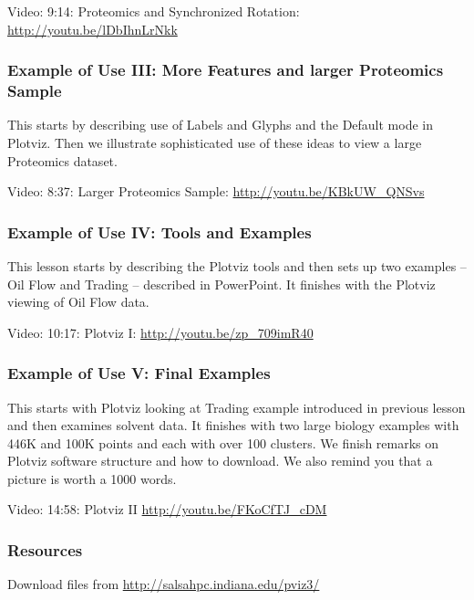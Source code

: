 Video: 9:14: Proteomics and Synchronized Rotation:
\url{http://youtu.be/lDbIhnLrNkk}

\subsubsection{Example of Use III: More Features and larger Proteomics
Sample}\label{example-of-use-iii-more-features-and-larger-proteomics-sample}

This starts by describing use of Labels and Glyphs and the Default mode
in Plotviz. Then we illustrate sophisticated use of these ideas to view
a large Proteomics dataset.

Video: 8:37: Larger Proteomics Sample: \url{http://youtu.be/KBkUW_QNSvs}

\subsubsection{Example of Use IV: Tools and
Examples}\label{example-of-use-iv-tools-and-examples}

This lesson starts by describing the Plotviz tools and then sets up two
examples -- Oil Flow and Trading -- described in PowerPoint. It finishes
with the Plotviz viewing of Oil Flow data.

Video: 10:17: Plotviz I: \url{http://youtu.be/zp_709imR40}

\subsubsection{Example of Use V: Final
Examples}\label{example-of-use-v-final-examples}

This starts with Plotviz looking at Trading example introduced in
previous lesson and then examines solvent data. It finishes with two
large biology examples with 446K and 100K points and each with over 100
clusters. We finish remarks on Plotviz software structure and how to
download. We also remind you that a picture is worth a 1000 words.

Video: 14:58: Plotviz II \url{http://youtu.be/FKoCfTJ_cDM}

\subsubsection{Resources}\label{resources}

Download files from \url{http://salsahpc.indiana.edu/pviz3/}
